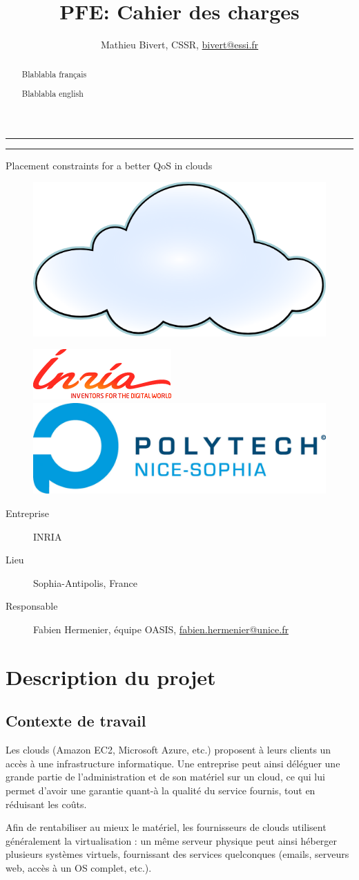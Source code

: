 \documentclass[a4paper]{article}
\author{Mathieu Bivert, CSSR, \href{mailto:bivert@essi.fr}{bivert@essi.fr}}
\title{PFE: Cahier des charges}
\makeatletter
\def\maketitle{%
  \null
  \thispagestyle{empty}%
  \vskip 1cm
  \begin{flushright}
        \normalfont\Large\@author
  \end{flushright}
  \vfil
  \hrule height 2pt
  \par
  \begin{center}
        \huge \strut \@title \par
  \end{center}
  \hrule height 2pt
  \par
  \vfil
  \vfil
  \null
\begin{center}
\Huge{Placement constraints for a better QoS in clouds}
\end{center}
\begin{figure}[!ht]
        \centering
        \includegraphics[scale=.45]{imgs/cloud.png}
\end{figure}
\vfil
\begin{figure}[!ht]
        \centering
        \begin{minipage}[c]{.46\linewidth}
                \includegraphics[scale=.3]{imgs/inria.png}
        \end{minipage}
        \begin{minipage}[c]{.2\linewidth}
                \includegraphics[scale=.5]{imgs/polytech.png}
        \end{minipage}
\end{figure}
\vfil
\begin{description}
        \item[Entreprise] INRIA
        \item[Lieu] Sophia-Antipolis, France
        \item[Responsable] Fabien Hermenier, équipe OASIS,
        	\href{mailto:fabien.hermenier@unice.fr}{fabien.hermenier@unice.fr}
\end{description}
  \cleardoublepage
  }
\makeatother
\begin{document}
\maketitle

\begin{abstract}
Blablabla français
\end{abstract}

\begin{abstract}
Blablabla english
\end{abstract}

\tableofcontents
\newpage
\section{Description du projet}
\subsection{Contexte de travail}
Les clouds (Amazon EC2, Microsoft Azure, etc.) proposent à leurs clients
un accès à une infrastructure informatique. Une entreprise peut ainsi
déléguer une grande partie de l'administration et de son matériel sur
un cloud, ce qui lui permet d'avoir une garantie quant-à la qualité du
service fournis, tout en réduisant les coûts.

Afin de rentabiliser au mieux le matériel, les fournisseurs de clouds
utilisent généralement la virtualisation : un même serveur physique
peut ainsi héberger plusieurs systèmes virtuels, fournissant des services
quelconques (emails, serveurs web, accès à un OS complet, etc.).
\end{document}
